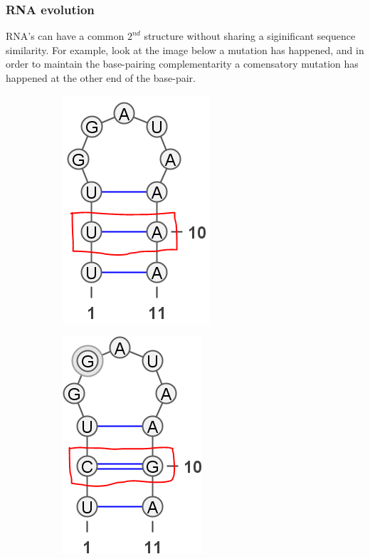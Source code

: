     \subsubsection{RNA evolution}
    RNA's can have a common $2^{nd}$ structure without sharing a siginificant 
    sequence similarity. For example, look at the image below a mutation has 
    happened, and in order to maintain the base-pairing complementarity a 
    comensatory mutation has happened at the other end of the base-pair.
    \begin{figure}[H]
        \begin{subfigure}{.5\textwidth}
            \centering
            \includegraphics[width=.6\linewidth]{figures/rna-mut-1.png}
        \end{subfigure}%
        \begin{subfigure}{.5\textwidth}
            \centering
            \includegraphics[width=.6\linewidth]{figures/rna-mut-2.png}

\end{subfigure}
\end{figure}
